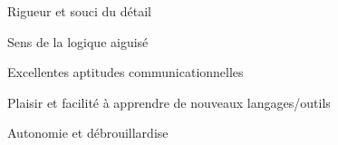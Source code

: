 

\begin{cventries}

  \cventry
    {} %
    {} %
    {} %
    {} %
    {
      \begin{cvitems} %
        \item {Rigueur et souci du détail}
        \item {Sens de la logique aiguisé}
        \item {Excellentes aptitudes communicationnelles}
        \item {Plaisir et facilité à apprendre de nouveaux langages/outils}
        \item {Autonomie et débrouillardise}
      \end{cvitems}
    }

\end{cventries}

